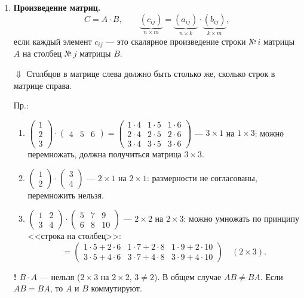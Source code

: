 \documentclass[a4paper, 12pt]{article}
\begin{document}
\begin{enumerate}[label=\arabic*)]
    \textbf{Замечание.} С геометрической точки зрения
    $a^T b = 0 \Longleftrightarrow$ <<$a \perp b$>>.
    $a^2 = a^T a$ (скалярный квадрат); $|a| = \sqrt{a^2}$ (евклидова длина $a$).

  \item \textbf{Произведение матриц.}
    \[
      C = A \cdot B, \qquad
      \underbrace{(c_{ij})}_{n \times m} = \underbrace{(a_{ij})}_{n \times k}
      \cdot \underbrace{(b_{ij})}_{k \times m},
    \]
    если каждый элемент $c_{ij}$ --- это скалярное произведение строки №\,$i$
    матрицы $A$ на столбец №\,$j$ матрицы $B$.

    $\Downarrow$ Столбцов в матрице слева должно быть столько же, сколько
    строк в матрице справа.

    Пр.:
    \begin{enumerate}[label=\arabic*)]
      \item $\begin{pmatrix} 1 \\ 2 \\ 3 \end{pmatrix} \cdot \begin{pmatrix} 4 & 5 & 6 \end{pmatrix}
        = \begin{pmatrix} 1\cdot4 & 1\cdot5 & 1\cdot6 \\ 2\cdot4 & 2\cdot5 & 2\cdot6 \\ 3\cdot4 & 3\cdot5 & 3\cdot6 \end{pmatrix}$
        --- $3 \times 1$ на $1 \times 3$: можно перемножать, должна
        получиться матрица $3 \times 3$.
      \item $\begin{pmatrix} 1 \\ 2 \end{pmatrix} \cdot \begin{pmatrix} 3 \\ 4 \end{pmatrix}$
        --- $2 \times 1$ на $2 \times 1$: размерности не согласованы,
        перемножить нельзя.
      \item $\begin{pmatrix} 1 & 2 \\ 3 & 4 \end{pmatrix} \cdot
        \begin{pmatrix} 5 & 7 & 9 \\ 6 & 8 & 10 \end{pmatrix}$
        --- $2 \times 2$ на $2 \times 3$: можно умножать по принципу
        <<строка на столбец>>:
        \[
          = \begin{pmatrix}
              1\cdot5 + 2\cdot6 & 1\cdot7 + 2\cdot8 & 1\cdot9 + 2\cdot10 \\
              3\cdot5 + 4\cdot6 & 3\cdot7 + 4\cdot8 & 3\cdot9 + 4\cdot10
            \end{pmatrix} \quad (2 \times 3).
        \]
    \end{enumerate}

    \textbf{!} $B \cdot A$ --- нельзя ($2 \times 3$ на $2 \times 2$, $3 \ne 2$).
    В общем случае $AB \ne BA$. Если $AB = BA$, то $A$ и $B$ коммутируют.
\end{enumerate}
\end{document}
